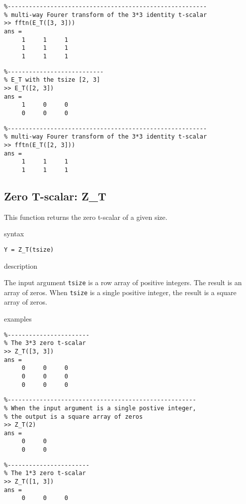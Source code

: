 \documentclass[12pt,reqno]{amsart}
\numberwithin{equation}{section}
\numberwithin{figure}{section}
\numberwithin{table}{section}
\theoremstyle{definition}
\begin{document}
\begin{verbatim}
%--------------------------------------------------------   
% multi-way Fourer transform of the 3*3 identity t-scalar
>> fftn(E_T([3, 3]))
ans =
     1     1     1
     1     1     1
     1     1     1
\end{verbatim}



\begin{verbatim}     
%---------------------------   
% E_T with the tsize [2, 3]
>> E_T([2, 3])
ans =
     1     0     0
     0     0     0
\end{verbatim}


\begin{verbatim}  
%--------------------------------------------------------   
% multi-way Fourer transform of the 3*3 identity t-scalar
>> fftn(E_T([2, 3]))
ans =
     1     1     1
     1     1     1
\end{verbatim}


\subsection{{\color{blue} \sc Zero T-scalar}: {\color{blue}Z\_T}} 
This function returns the zero t-scalar of a given size. 


\noindent 
{\color{red} \sc syntax}

{\tt  Y = Z\_T(tsize) }


\noindent
{\color{red} \sc description}

The input argument {\tt tsize} is a row array of positive integers. The result is an array of zeros. 
When  {\tt tsize} is a single positive integer, the result is a square array of zeros. 


\noindent
{\color{red} \sc examples}
\begin{verbatim}
%-----------------------   
% The 3*3 zero t-scalar  
>> Z_T([3, 3])
ans =
     0     0     0
     0     0     0
     0     0     0
\end{verbatim}

  
\begin{verbatim}
%-----------------------------------------------------   
% When the input argument is a single postive integer, 
% the output is a square array of zeros
>> Z_T(2)
ans =
     0     0
     0     0
\end{verbatim}

\begin{verbatim}
%-----------------------   
% The 1*3 zero t-scalar  
>> Z_T([1, 3])
ans =
     0     0     0
\end{verbatim}
\end{document}
